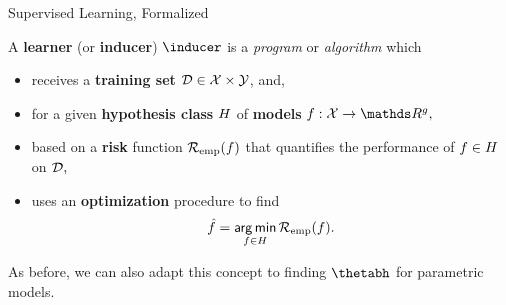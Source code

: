 \documentclass[11pt,compress,t,notes=noshow, xcolor=table]{beamer}
\begin{document}
\begin{vbframe}{Supervised Learning, Formalized}

A \textbf{learner} (or \textbf{inducer}) $\inducer$ is a \emph{program} or 
\emph{algorithm} which

\begin{itemize}

  \item receives a \textbf{training set} $\mathcal{D} \in \mathcal{X} \times \mathcal{Y}$, and,
  
  \item for a given \textbf{hypothesis class} $H$ of \textbf{models} 
  $f:\Xspace \rightarrow \R^g,$ 
  
  \item based on a \textbf{risk} function $\mathcal{R}_{\text{emp}}(f)$ that quantifies the 
  performance of $f \in H$ on $\mathcal{D},$
  
  \item uses an \textbf{optimization} procedure to find
  $$\hat{f} = \mathop{\sf arg\,min}_{f \in H} \mathcal{R}_{\text{emp}}(f).$$

\end{itemize}

\lz 

As before, we can also adapt this concept to finding $\thetabh$ for parametric
models.

\lz


\end{vbframe}



\end{document}
